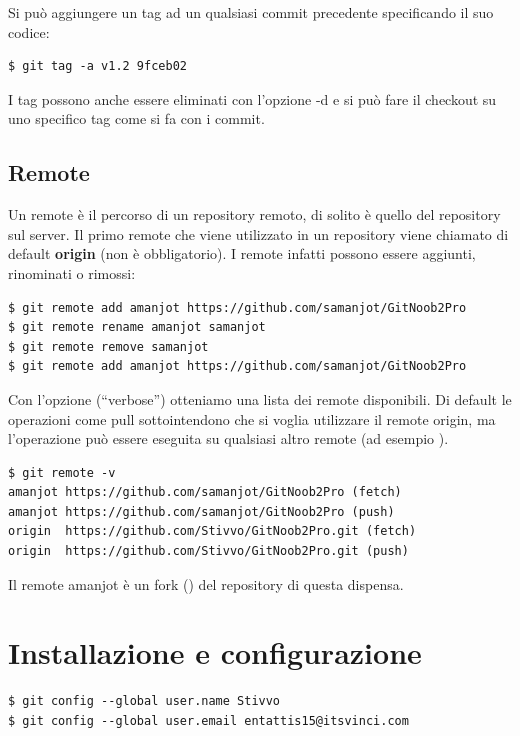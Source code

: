 \documentclass{article}
\begin{document}
Si può aggiungere un tag ad un qualsiasi commit precedente specificando il suo
codice:

\begin{verbatim}
$ git tag -a v1.2 9fceb02
\end{verbatim}

I tag possono anche essere eliminati con l'opzione -d e si può fare il checkout
su uno specifico tag come si fa con i commit.

\subsection{Remote\label{remoti}}
Un remote è il percorso di un repository remoto, di solito è quello del
repository sul server. Il primo remote che viene utilizzato in un repository
viene chiamato di default \textbf{origin} (non è obbligatorio). I remote infatti
possono essere aggiunti, rinominati o rimossi:

\begin{verbatim}
$ git remote add amanjot https://github.com/samanjot/GitNoob2Pro
$ git remote rename amanjot samanjot
$ git remote remove samanjot
$ git remote add amanjot https://github.com/samanjot/GitNoob2Pro
\end{verbatim}

Con l'opzione  (``verbose'') otteniamo una lista dei remote disponibili.
Di default le operazioni come pull sottointendono che si voglia utilizzare il 
remote origin, ma l'operazione può essere eseguita su qualsiasi altro remote
(ad esempio ).

\begin{verbatim}
$ git remote -v
amanjot	https://github.com/samanjot/GitNoob2Pro (fetch)
amanjot	https://github.com/samanjot/GitNoob2Pro (push)
origin	https://github.com/Stivvo/GitNoob2Pro.git (fetch)
origin	https://github.com/Stivvo/GitNoob2Pro.git (push)
\end{verbatim}

Il remote amanjot è un fork () del repository di questa dispensa.

\section{Installazione e configurazione\label{configurazione}}
\begin{verbatim}
$ git config --global user.name Stivvo
$ git config --global user.email entattis15@itsvinci.com
\end{verbatim}
\end{document}
